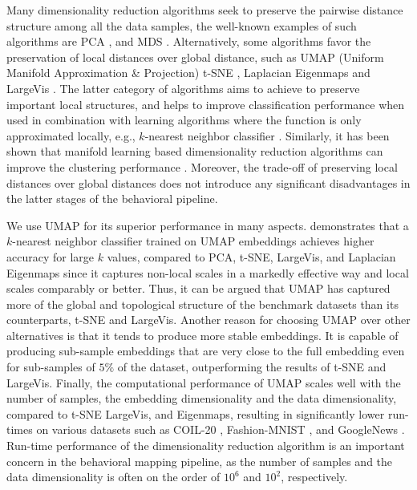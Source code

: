 Many dimensionality reduction algorithms seek to preserve the pairwise distance structure among all the data samples, the well-known examples of such algorithms are PCA \citep{hotelling_analysis_1933}, and MDS \citep{kruskal_multidimensional_1964}.
Alternatively, some algorithms favor the preservation of local distances over global distance, such as UMAP (Uniform Manifold Approximation \& Projection) \citep{mcinnes_umap_2020} t-SNE \citep{maaten_visualizing_2008}, Laplacian Eigenmaps \citep{belkin_laplacian_2003} and LargeVis \citep{tang_visualizing_2016}.
The latter category of algorithms aims to achieve to preserve important local structures, and helps to improve classification performance when used in combination with learning algorithms where the function is only approximated locally, e.g., $k$-nearest neighbor classifier \citep{mcinnes_umap_2020}.
Similarly, it has been shown that manifold learning based dimensionality reduction algorithms can improve the clustering performance \citep{sainburg_parametric_2021}.
Moreover, the trade-off of preserving local distances over global distances does not introduce any significant disadvantages in the latter stages of the behavioral pipeline.

We use UMAP for its superior performance in many aspects.
\citet{mcinnes_umap_2020} demonstrates that a $k$-nearest neighbor classifier trained on UMAP embeddings achieves higher accuracy for large $k$ values, compared to PCA, t-SNE, LargeVis, and Laplacian Eigenmaps since it captures non-local scales in a markedly effective way and local scales comparably or better.
Thus, it can be argued that UMAP has captured more of the global and topological structure of the benchmark datasets than its counterparts, t-SNE and LargeVis.
Another reason for choosing UMAP over other alternatives is that it tends to produce more stable embeddings.
It is capable of producing sub-sample embeddings that are very close to the full embedding even for sub-samples of $5\%$ of the dataset, outperforming the results of t-SNE and LargeVis.
Finally, the computational performance of UMAP scales well with the number of samples, the embedding dimensionality and the data dimensionality, compared to t-SNE LargeVis, and Eigenmaps, resulting in significantly lower run-times on various datasets such as  COIL-20 \citep{nene_columbia_1996}, Fashion-MNIST \citep{xiao_fashion-mnist_2017}, and GoogleNews \citep{mikolov_distributed_2013}.
Run-time performance of the dimensionality reduction algorithm is an important concern in the behavioral mapping pipeline, as the number of samples and the data dimensionality is often on the order of $10^6$ and $10^2$, respectively.

